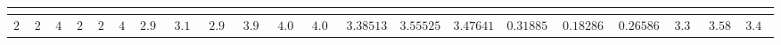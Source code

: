 \begin{table}[!tbp]
\begin{center}
\begin{tabular}{rrrrrrrrrrrrrrrrrrrrr}
\hline\hline
\multicolumn{1}{c}{}&\multicolumn{1}{c}{}&\multicolumn{1}{c}{}&\multicolumn{1}{c}{}&\multicolumn{1}{c}{}&\multicolumn{1}{c}{}&\multicolumn{1}{c}{}&\multicolumn{1}{c}{}&\multicolumn{1}{c}{}&\multicolumn{1}{c}{}&\multicolumn{1}{c}{}&\multicolumn{1}{c}{}&\multicolumn{1}{c}{}&\multicolumn{1}{c}{}&\multicolumn{1}{c}{}&\multicolumn{1}{c}{}&\multicolumn{1}{c}{}&\multicolumn{1}{c}{}&\multicolumn{1}{c}{}&\multicolumn{1}{c}{}&\multicolumn{1}{c}{}\tabularnewline
\hline
$20$&$22$&$42$&$20$&$22$&$42$&$2.906748$&$3.180285$&$2.906748$&$3.999968$&$4.013619$&$4.013619$&$3.38513794736842$&$3.55525072727273$&$3.47641797560976$&$0.318854822268602$&$0.182864793079004$&$0.265861403250781$&$3.369214$&$3.5843795$&$3.467422$\tabularnewline
\hline
\end{tabular}\end{center}
\end{table}
